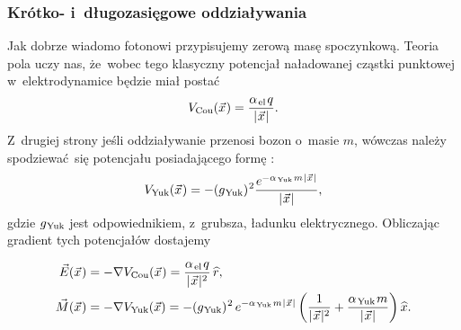 \documentclass[10pt,t]{beamer}
\begin{document}
\begin{frame}
  \frametitle{Krótko- i~długozasięgowe oddziaływania}


  Jak dobrze wiadomo fotonowi przypisujemy zerową masę spoczynkową.
  Teoria pola uczy nas, że~wobec tego \alert{klasyczny} potencjał
  naładowanej cząstki punktowej w~elektrodynamice będzie miał postać
  \begin{equation}
    \label{eq:Glowne-rodzaje-problemow-podczerwonych-04}
    V_{ \text{Cou} }( \vec{x} \hspace{0.05em} ) =
    \frac{ \alpha_{ \hspace{0.09em} \text{el} } \hspace{0.09em} q }
    { | \hspace{0.05em}  \vec{x}  \hspace{0.05em} | }.
  \end{equation}
  Z~drugiej strony jeśli oddziaływanie przenosi bozon o~masie $m$, wówczas
  należy spodziewać~się potencjału posiadającego formę
  :
  \begin{equation}
    \label{eq:Glowne-rodzaje-problemow-podczerwonych-05}
    V_{ \text{Yuk} }( \vec{x} \hspace{0.05em} ) =
    -( g_{ \hspace{0.05em} \text{Yuk} } )^{ \hspace{0.05em} 2 }
    \frac{ e^{ -\alpha_{ \hspace{0.09em} \text{Yuk} } \hspace{0.09em} m
        \hspace{0.05em} | \hspace{0.05em}  \vec{x}  \hspace{0.05em} | } }
    { | \hspace{0.05em}  \vec{x}  \hspace{0.05em} | },
  \end{equation}
  gdzie $g_{ \hspace{0.05em} \text{Yuk} }$ jest odpowiednikiem, z~grubsza, ładunku
  elektrycznego. Obliczając gradient tych potencjałów dostajemy

  \vspace{-1.5em}


  \begin{subequations}

    \begin{align}
      \label{eq:Glowne-rodzaje-problemow-podczerwonych-06-A}
      \vec{E}( \vec{x} \hspace{0.05em} )
      &= -\nabla V_{ \text{Cou} }( \vec{x} \hspace{0.05em} ) =
        \frac{ \alpha_{ \hspace{0.09em} \text{el} } \hspace{0.09em} q }
        { | \hspace{0.05em}  \vec{x}  \hspace{0.05em} |^{ 2 } } \,
        \widehat{ r }, \\
      \label{eq:Glowne-rodzaje-problemow-podczerwonych-06-B}
      \vec{ M }( \vec{x} \hspace{0.05em} )
      &=
        -\nabla V_{ \text{Yuk} }( \vec{x} ) =
        -( g_{ \hspace{0.05em} \text{Yuk} } )^{ \hspace{0.05em} 2 } \,
        e^{ -\alpha_{ \hspace{0.09em} \text{Yuk} } \hspace{0.09em} m \hspace{0.05em}
        | \hspace{0.05em}  \vec{x}  \hspace{0.05em} | }
        \left( \frac{ 1 }{ | \hspace{0.05em}  \vec{x}  \hspace{0.05em} |^{ 2 } } +
        \frac{ \alpha_{ \hspace{0.09em} \text{Yuk} } \hspace{0.09em} m }
        { | \hspace{0.05em}  \vec{x}  \hspace{0.05em} | } \right)
        \widehat{ x }.
    \end{align}

  \end{subequations}

\end{frame}
\end{document}

